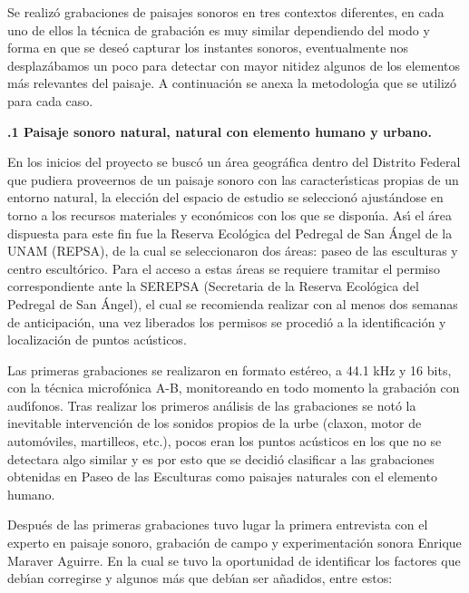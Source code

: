 Se realiz\'{o} grabaciones de paisajes sonoros en tres contextos diferentes,
en cada uno de ellos la t\'{e}cnica de grabaci\'{o}n es muy similar
dependiendo del modo y forma en que se dese\'{o} capturar los instantes
sonoros, eventualmente nos desplaz\'{a}bamos un poco para detectar con mayor
nitidez algunos de los elementos m\'{a}s relevantes del paisaje. A
continuaci\'{o}n se anexa la metodolog\'{\i}a que se utiliz\'{o} para cada caso.

\textbf{\qquad{}.1 Paisaje sonoro natural, natural con elemento humano
y urbano.}

En los inicios del proyecto se busc\'{o} un \'{a}rea geogr\'{a}fica dentro del
Distrito Federal que pudiera proveernos de un paisaje sonoro con las
caracter\'{\i}sticas propias de un entorno natural, la elecci\'{o}n del
espacio de estudio se seleccion\'{o} ajust\'{a}ndose en torno a los recursos
materiales y econ\'{o}micos con los que se dispon\'{\i}a. As\'{\i} el \'{a}rea
dispuesta para este fin fue la Reserva Ecol\'{o}gica del Pedregal de San
\'{A}ngel de la UNAM (REPSA), de la cual se seleccionaron dos \'{a}reas: paseo
de las esculturas y centro escult\'{o}rico. Para el acceso a estas \'{a}reas
se requiere tramitar el permiso correspondiente ante la SEREPSA (Secretaria de
la Reserva Ecol\'{o}gica del Pedregal de San \'{A}ngel), el cual se recomienda
realizar con al menos dos semanas de anticipaci\'{o}n, una vez liberados los
permisos se procedi\'{o} a la identificaci\'{o}n y localizaci\'{o}n de puntos ac\'{u}sticos.

Las primeras grabaciones se realizaron en formato est\'{e}reo, a 44.1 kHz y 16
bits, con la t\'{e}cnica microf\'{o}nica A-B, monitoreando en todo momento la
grabaci\'{o}n con aud\'{\i}fonos. Tras realizar los primeros an\'{a}lisis de
las grabaciones se not\'{o} la inevitable intervenci\'{o}n de los sonidos
propios de la urbe (claxon, motor de autom\'{o}viles, martilleos, etc.), pocos
eran los puntos ac\'{u}sticos en los que no se detectara algo similar y es por
esto que se decidi\'{o} clasificar a las grabaciones obtenidas en Paseo de las
Esculturas como paisajes naturales con el elemento humano.

Despu\'{e}s de las primeras grabaciones tuvo lugar la primera entrevista con
el experto en paisaje sonoro, grabaci\'{o}n de campo y experimentaci\'{o}n
sonora Enrique Maraver Aguirre. En la cual se tuvo la oportunidad de
identificar los factores que deb\'{\i}an corregirse y algunos m\'{a}s que
deb\'{\i}an ser a\~{n}adidos, entre estos:

